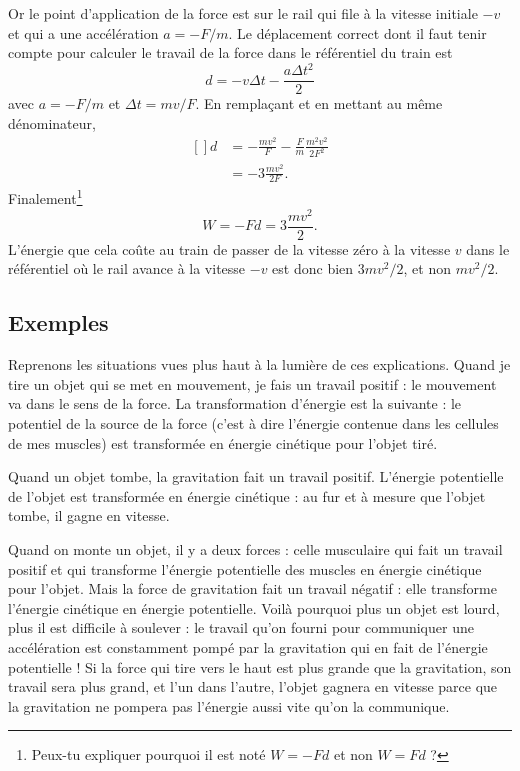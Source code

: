 \documentclass[a4paper,12pt]{book}
\theoremstyle{mes_exemples}	\newtheorem{exemple}[numtho]{Exemple}
\theoremstyle{mes_tho}
\begin{document}
Or le point d'application de la force est sur le rail qui file à la vitesse initiale $-v$ et qui a une accélération $a=-F/m$. Le déplacement correct dont il faut tenir compte pour calculer le travail de la force dans le référentiel du train est
\begin{equation}
	d=-v\Delta t-\frac{ a\Delta t^2 }{ 2 }
\end{equation}
avec $a=-F/m$ et $\Delta t=mv/F$. En remplaçant et en mettant au même dénominateur,
\begin{equation}
	\begin{aligned}[]
		d&=-\frac{ mv^2 }{ F }-\frac{ F }{ m }\frac{ m^2v^2 }{ 2F^2 }\\
		&=-3\frac{ mv^2 }{ 2F }.
	\end{aligned}
\end{equation}
Finalement\footnote{Peux-tu expliquer pourquoi il est noté $W=-Fd$ et non $W=Fd$ ?}
\begin{equation}
	W=-Fd=3\frac{ mv^2 }{ 2 }.
\end{equation}
L'énergie que cela coûte au train de passer de la vitesse zéro à la vitesse $v$ dans le référentiel où le rail avance à la vitesse $-v$ est donc bien $3mv^2/2$, et non $mv^2/2$.

\subsection{Exemples}

Reprenons les situations vues plus haut à la lumière de ces explications. Quand je tire un objet qui se met en mouvement, je fais un travail positif : le mouvement va dans le sens de la force. La transformation d'énergie est la suivante : le potentiel de la source de la force (c'est à dire l'énergie contenue dans les cellules de mes muscles) est transformée en énergie cinétique pour l'objet tiré.

Quand un objet tombe, la gravitation fait un travail positif. L'énergie potentielle de l'objet est transformée en énergie cinétique : au fur et à mesure que l'objet tombe, il gagne en vitesse.

Quand on monte un objet, il y a deux forces : celle musculaire qui fait un travail positif et qui transforme l'énergie potentielle des muscles en énergie cinétique pour l'objet. Mais la force de gravitation fait un travail négatif : elle transforme l'énergie cinétique en énergie potentielle. Voilà pourquoi plus un objet est lourd, plus il est difficile à soulever : le travail qu'on fourni pour communiquer une accélération est constamment pompé par la gravitation qui en fait de l'énergie potentielle ! Si la force qui tire vers le haut est plus grande que la gravitation, son travail sera plus grand, et l'un dans l'autre, l'objet gagnera en vitesse parce que la gravitation ne pompera pas l'énergie aussi vite qu'on la communique.
\end{document}
